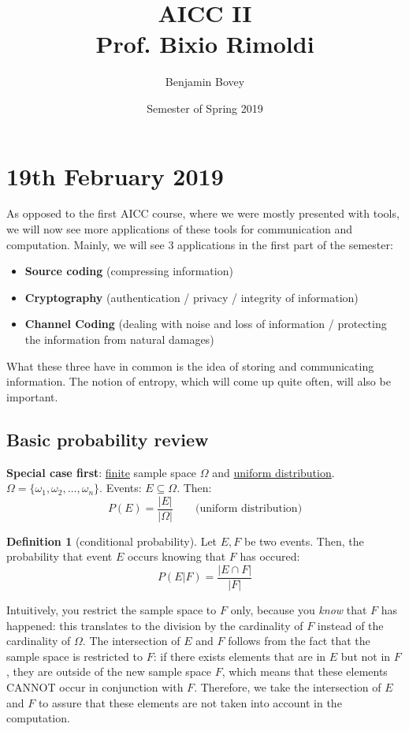 \documentclass{article}
\title{AICC II \\ Prof. Bixio Rimoldi}
\author{Benjamin Bovey}
\date{Semester of Spring 2019}
\theoremstyle{plain}
\theoremstyle{definition}
\newtheorem{defn}{Definition}
\theoremstyle{remark}
\begin{document}
\maketitle


\section{19th February 2019}
As opposed to the first AICC course, where we were mostly presented with tools, we will now see more applications of these tools for communication and computation. Mainly, we will see 3 applications in the first part of the semester:
\begin{itemize}
	\item \textbf{Source coding} (compressing information)
	\item \textbf{Cryptography} (authentication / privacy / integrity of information)
	\item \textbf{Channel Coding} (dealing with noise and loss of information / protecting the information from natural damages)
\end{itemize}
What these three have in common is the idea of storing and communicating information. The notion of entropy, which will come up quite often, will also be important.

\subsection{Basic probability review}
\textbf{Special case first}: \underline{finite} sample space $\Omega$ and \underline{uniform distribution}. $\Omega = \{\omega_1, \omega_2, \dots, \omega_n\}$. Events: $E \subseteq \Omega$. Then:
\begin{equation}
	P(E) = \dfrac{|E|}{|\Omega|} \qquad \text{(uniform distribution)}
\end{equation}

\begin{defn}[conditional probability]
Let $E, F$ be two events. Then, the probability that event $E$ occurs knowing that $F$ has occured:
\begin{equation}
	P(E|F) = \dfrac{|E \cap F|}{|F|}
\end{equation}
\end{defn}
Intuitively, you restrict the sample space to $F$ only, because you \emph{know} that $F$ has happened: this translates to the division by the cardinality of $F$ instead of the cardinality of $\Omega$. The intersection of $E$ and $F$ follows from the fact that the sample space is restricted to $F$: if there exists elements that are in $E$ but not in $F$, they are outside of the new sample space $F$, which means that these elements CANNOT occur in conjunction with $F$. Therefore, we take the intersection of $E$ and $F$ to assure that these elements are not taken into account in the computation.
\end{document}

